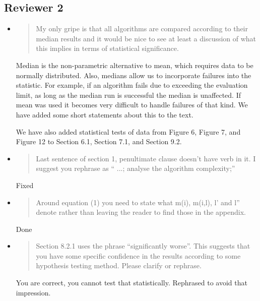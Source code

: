 \documentclass[]{article}
\begin{document}
\subsection{Reviewer 2}
\begin{itemize}

\item
\begin{quote}
My only gripe is that all algorithms are compared according to their median results and it would be nice to see at least a discussion of what this implies in terms of statistical significance.
\end{quote}

Median is the non-parametric alternative to mean, which requires data to be normally distributed.
Also, medians allow us to incorporate failures into the statistic. For example, if an algorithm fails due to
exceeding the evaluation limit, as long as the median run is successful the median is unaffected. If mean was used
it becomes very difficult to handle failures of that kind. We have added some short statements about this to the text.

We have also added statistical tests of data from Figure 6, Figure 7, and Figure 12 to Section 6.1, Section 7.1, and Section 9.2.

\item
\begin{quote}
Last sentence of section 1, penultimate clause doesn't have  verb in it. I suggest you rephrase as `` ...; analyse the algorithm complexity;''
\end{quote}

Fixed

\item
\begin{quote}
Around equation (1) you need to state what m(i), m(i,l), l' and l'' denote rather than leaving the reader to find those in the appendix.
\end{quote}

Done

\item
\begin{quote}
Section 8.2.1 uses the phrase ``significantly worse''.  This suggests that you have some specific confidence in the results according to some hypothesis testing method.  Please clarify or rephrase.
\end{quote}

You are correct, you cannot test that statistically. Rephrased to avoid that impression.

\end{itemize}
\end{document}
